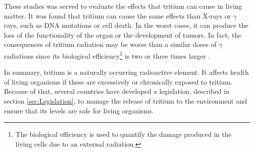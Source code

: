 These studies was served to evaluate the effects that tritium can cause in living matter. It was found that tritium can cause the same effects than X-rays or $\gamma$ rays, such as DNA mutations or cell death. In the worst cases, it can produce the loss of the functionality of the organ or the development of tumors. In fact, the consequences of tritium radiation may be worse than a similar doses of $\gamma$ radiations since its biological efficiency\footnote{The biological efficiency is used to quantify the damage produced in the living cells due to an external radiation.} is two or three times larger \cite{StraumeTritiumHazard}.


In summary, tritium is a naturally occurring radioactive element. It affects health of living organisms if these are excessively or chronically exposed to tritium. Because of that, several countries have developed a legislation, described in section \ref{sec:Legislation}, to manage the release of tritium to the environment and ensure that its levels are safe for living organisms.




